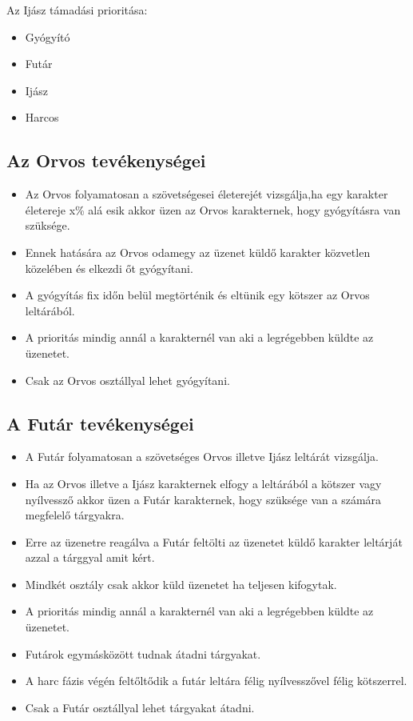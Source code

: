 Az Ijász támadási prioritása:

\begin{itemize}
  \item Gyógyító
  \item Futár
  \item Ijász
  \item Harcos
\end{itemize}

\subsection{Az Orvos tevékenységei}

\begin{itemize}
  \item Az Orvos folyamatosan a szövetségesei életerejét vizsgálja,ha egy karakter életereje x\% alá esik akkor üzen az Orvos karakternek, hogy gyógyításra van szüksége.
  \item Ennek hatására az Orvos odamegy az üzenet küldő karakter közvetlen közelében és elkezdi őt gyógyítani.
  \item A gyógyítás fix időn belül megtörténik és eltünik egy kötszer az Orvos leltárából.
  \item A prioritás mindig annál a karakternél van aki a legrégebben küldte az üzenetet.
  \item Csak az Orvos osztállyal lehet gyógyítani.
\end{itemize}

\newpage

\subsection{A Futár tevékenységei}

\begin{itemize}
  \item A Futár folyamatosan a szövetséges Orvos illetve Ijász leltárát vizsgálja.
  \item Ha az Orvos illetve a Ijász karakternek elfogy a leltárából a kötszer vagy nyílvessző akkor üzen a Futár karakternek, hogy szüksége van a számára megfelelő tárgyakra.
  \item Erre az üzenetre reagálva a Futár feltölti az üzenetet küldő karakter leltárját azzal a tárggyal amit kért.
  \item Mindkét osztály csak akkor küld üzenetet ha teljesen kifogytak.
  \item A prioritás mindig annál a karakternél van aki a legrégebben küldte az üzenetet.
  \item Futárok egymásközött tudnak átadni tárgyakat.
  \item A harc fázis végén feltőltődik a futár leltára félig nyílvesszővel félig kötszerrel.
  \item Csak a Futár osztállyal lehet tárgyakat átadni.
\end{itemize}

